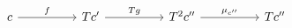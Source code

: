 \[\begin{tikzcd}
	c && {Tc'} && {T^{2}c''} && {Tc''}
	\arrow["f", from=1-1, to=1-3]
	\arrow["Tg", from=1-3, to=1-5]
	\arrow["{\mu_{c''}}", from=1-5, to=1-7]
\end{tikzcd}\]